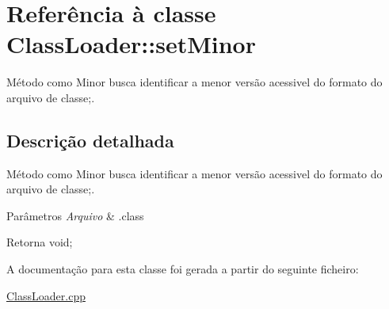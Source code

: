 \hypertarget{class_class_loader_1_1set_minor}{}\section{Referência à classe Class\+Loader\+:\+:set\+Minor}
\label{class_class_loader_1_1set_minor}


Método como Minor busca identificar a menor versão acessivel do formato do arquivo de classe;.  




\subsection{Descrição detalhada}
Método como Minor busca identificar a menor versão acessivel do formato do arquivo de classe;. 


\begin{DoxyParams}{Parâmetros}
{\em Arquivo} & .class \\
\hline
\end{DoxyParams}
\begin{DoxyReturn}{Retorna}
void; 
\end{DoxyReturn}


A documentação para esta classe foi gerada a partir do seguinte ficheiro\+:\begin{DoxyCompactItemize}
\item 
\hyperlink{_class_loader_8cpp}{Class\+Loader.\+cpp}\end{DoxyCompactItemize}
